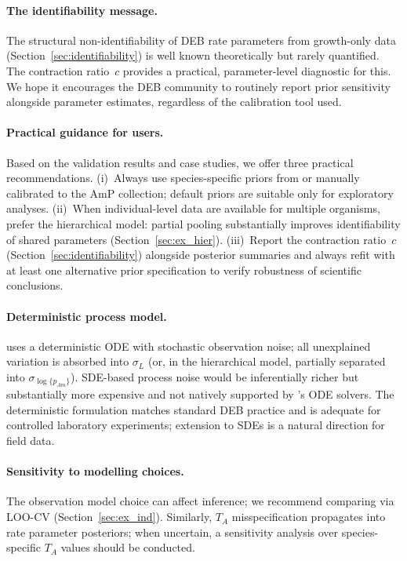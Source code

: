 \documentclass[article,shortnames]{jss}
\newcommand{\pAm}{\{p_{Am}\}}
\begin{document}
\paragraph{The identifiability message.}
The structural non-identifiability of DEB rate parameters from
growth-only data (Section~\ref{sec:identifiability}) is well known
theoretically but rarely quantified.  The contraction ratio~$c$
provides a practical, parameter-level diagnostic for this.  We
hope it encourages the DEB community to routinely report prior
sensitivity alongside parameter estimates, regardless of the
calibration tool used.

\paragraph{Practical guidance for users.}
Based on the validation results and case studies, we offer three
practical recommendations.
(i)~Always use species-specific priors from
 or manually calibrated to the AmP collection;
default priors are suitable only for exploratory analyses.
(ii)~When individual-level data are available for multiple organisms,
prefer the hierarchical model: partial pooling substantially
improves identifiability of shared parameters
(Section~\ref{sec:ex_hier}).
(iii)~Report the contraction ratio~$c$
(Section~\ref{sec:identifiability}) alongside posterior summaries
and always refit with at least one alternative prior specification
to verify robustness of scientific conclusions.

\paragraph{Deterministic process model.}
 uses a deterministic ODE with stochastic
observation noise; all unexplained variation is absorbed into
$\sigma_L$ (or, in the hierarchical model, partially separated
into $\sigma_{\log \pAm}$).  SDE-based process noise would be
inferentially richer but substantially more expensive and not
natively supported by 's ODE solvers.  The
deterministic formulation matches standard DEB practice and is
adequate for controlled laboratory experiments; extension to SDEs
is a natural direction for field data.

\paragraph{Sensitivity to modelling choices.}
The observation model choice can affect inference; we recommend
comparing via LOO-CV (Section~\ref{sec:ex_ind}).  Similarly,
$T_A$ misspecification propagates into rate parameter posteriors;
when uncertain, a sensitivity analysis over species-specific $T_A$
values should be conducted.
\end{document}
